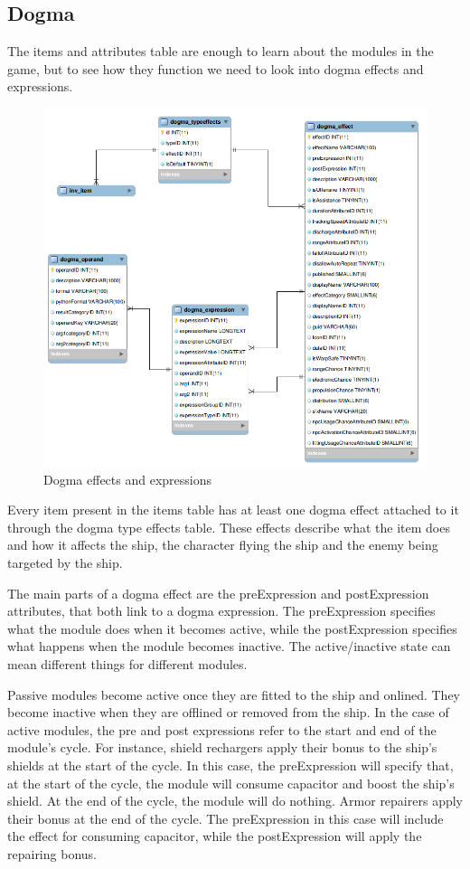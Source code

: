 \subsection{Dogma}
The items and attributes table are enough to learn about the modules in the game, but to see how they function we need to look into dogma effects and expressions.

\begin{figure}[h]
\centering
\includegraphics[width=0.7\linewidth]{src/img/dogma}
\caption{Dogma effects and expressions}
\label{fig:dogma}
\end{figure}

Every item present in the items table has at least one dogma effect attached to it through the dogma type effects table. These effects describe what the item does and how it affects the ship, the character flying the ship and the enemy being targeted by the ship.

The main parts of a dogma effect are the preExpression and postExpression attributes, that both link to a dogma expression. The preExpression specifies what the module does when it becomes active, while the postExpression specifies what happens when the module becomes inactive. The active/inactive state can mean different things for different modules.

Passive modules become active once they are fitted to the ship and onlined. They become inactive when they are offlined or removed from the ship. In the case of active modules, the pre and post expressions refer to the start and end of the module’s cycle. For instance, shield rechargers apply their bonus to the ship’s shields at the start of the cycle. In this case, the preExpression will specify that, at the start of the cycle, the module will consume capacitor and boost the ship’s shield. At the end of the cycle, the module will do nothing. Armor repairers apply their bonus at the end of the cycle. The preExpression in this case will include the effect for consuming capacitor, while the postExpression will apply the repairing bonus.


